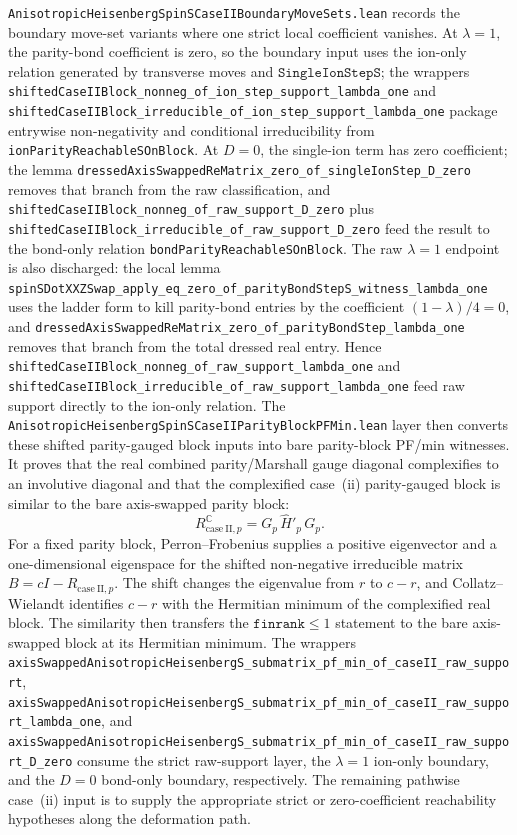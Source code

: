 \documentclass[a4paper,11pt]{article}
\begin{document}
\texttt{AnisotropicHeisenbergSpinSCaseIIBoundaryMoveSets.lean} records the
boundary move-set variants where one strict local coefficient vanishes.  At
\(\lambda=1\), the parity-bond coefficient is zero, so the boundary input uses
the ion-only relation generated by transverse moves and
\(\texttt{SingleIonStepS}\); the wrappers
\texttt{shiftedCaseIIBlock\_nonneg\_of\_ion\_step\_support\_lambda\_one} and
\texttt{shiftedCaseIIBlock\_irreducible\_of\_ion\_step\_support\_lambda\_one}
package entrywise non-negativity and conditional irreducibility from
\texttt{ionParityReachableSOnBlock}.  At \(D=0\), the single-ion term has zero
coefficient; the lemma
\texttt{dressedAxisSwappedReMatrix\_zero\_of\_singleIonStep\_D\_zero} removes
that branch from the raw classification, and
\texttt{shiftedCaseIIBlock\_nonneg\_of\_raw\_support\_D\_zero} plus
\texttt{shiftedCaseIIBlock\_irreducible\_of\_raw\_support\_D\_zero} feed the
result to the bond-only relation \texttt{bondParityReachableSOnBlock}.  The
raw \(\lambda=1\) endpoint is also discharged: the local lemma
\texttt{spinSDotXXZSwap\_apply\_eq\_zero\_of\_parityBondStepS\_witness\_lambda\_one}
uses the ladder form to kill parity-bond entries by the coefficient
\((1-\lambda)/4=0\), and
\texttt{dressedAxisSwappedReMatrix\_zero\_of\_parityBondStep\_lambda\_one}
removes that branch from the total dressed real entry.  Hence
\texttt{shiftedCaseIIBlock\_nonneg\_of\_raw\_support\_lambda\_one} and
\texttt{shiftedCaseIIBlock\_irreducible\_of\_raw\_support\_lambda\_one} feed
raw support directly to the ion-only relation.  The
\texttt{AnisotropicHeisenbergSpinSCaseIIParityBlockPFMin.lean} layer then
converts these shifted parity-gauged block inputs into bare parity-block
PF/min witnesses.  It proves that the real combined parity/Marshall gauge
diagonal complexifies to an involutive diagonal and that the complexified
case~(ii) parity-gauged block is similar to the bare axis-swapped parity
block:
\[
  R_{\mathrm{case~II},p}^{\mathbb C}
  = G_p\,\widehat H'_{p}\,G_p .
\]
For a fixed parity block, Perron--Frobenius supplies a positive eigenvector and
a one-dimensional eigenspace for the shifted non-negative irreducible matrix
\(B=cI-R_{\mathrm{case~II},p}\).  The shift changes the eigenvalue from
\(r\) to \(c-r\), and Collatz--Wielandt identifies \(c-r\) with the Hermitian
minimum of the complexified real block.  The similarity then transfers the
\(\texttt{finrank}\le1\) statement to the bare axis-swapped block at its
Hermitian minimum.  The wrappers
\texttt{axisSwappedAnisotropicHeisenbergS\_submatrix\_pf\_min\_of\_caseII\_raw\_support},
\texttt{axisSwappedAnisotropicHeisenbergS\_submatrix\_pf\_min\_of\_caseII\_raw\_support\_lambda\_one},
and
\texttt{axisSwappedAnisotropicHeisenbergS\_submatrix\_pf\_min\_of\_caseII\_raw\_support\_D\_zero}
consume the strict raw-support layer, the \(\lambda=1\) ion-only boundary,
and the \(D=0\) bond-only boundary, respectively.  The remaining pathwise
case~(ii) input is to supply the appropriate strict or zero-coefficient
reachability hypotheses along the deformation path.
\end{document}
